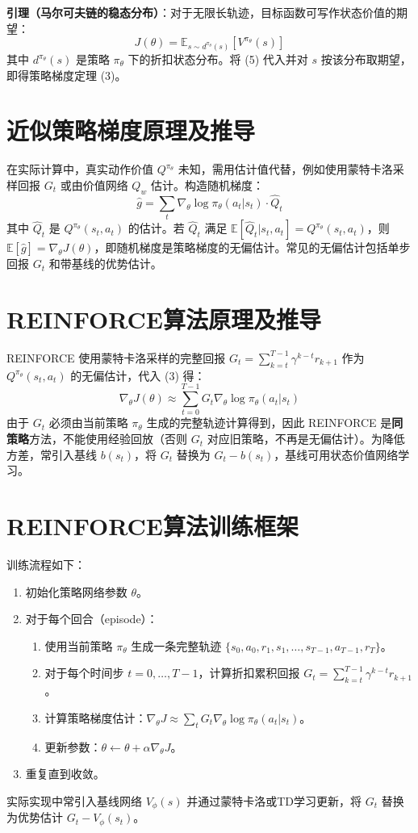 \documentclass{article}
\begin{document}
\textbf{引理（马尔可夫链的稳态分布）}：对于无限长轨迹，目标函数可写作状态价值的期望：
\[
J(\theta) = \mathbb{E}_{s \sim d^{\pi_\theta}(s)} \left[ V^{\pi_\theta}(s) \right] \tag{6}
\]
其中 \(d^{\pi_\theta}(s)\) 是策略 \(\pi_\theta\) 下的折扣状态分布。将 (5) 代入并对 \(s\) 按该分布取期望，即得策略梯度定理 (3)。

\section{近似策略梯度原理及推导}
在实际计算中，真实动作价值 \(Q^{\pi_\theta}\) 未知，需用估计值代替，例如使用蒙特卡洛采样回报 \(G_t\) 或由价值网络 \(Q_w\) 估计。构造随机梯度：
\[
\hat{g} = \sum_t \nabla_\theta \log \pi_\theta(a_t|s_t) \cdot \hat{Q}_t \tag{7}
\]
其中 \(\hat{Q}_t\) 是 \(Q^{\pi_\theta}(s_t,a_t)\) 的估计。若 \(\hat{Q}_t\) 满足 \(\mathbb{E}[\hat{Q}_t | s_t,a_t] = Q^{\pi_\theta}(s_t,a_t)\)，则 \(\mathbb{E}[\hat{g}] = \nabla_\theta J(\theta)\)，即随机梯度是策略梯度的无偏估计。常见的无偏估计包括单步回报 \(G_t\) 和带基线的优势估计。

\section{REINFORCE算法原理及推导}
REINFORCE 使用蒙特卡洛采样的完整回报 \(G_t = \sum_{k=t}^{T-1} \gamma^{k-t} r_{k+1}\) 作为 \(Q^{\pi_\theta}(s_t,a_t)\) 的无偏估计，代入 (3) 得：
\[
\nabla_\theta J(\theta) \approx \sum_{t=0}^{T-1} G_t \nabla_\theta \log \pi_\theta(a_t|s_t) \tag{8}
\]
由于 \(G_t\) 必须由当前策略 \(\pi_\theta\) 生成的完整轨迹计算得到，因此 REINFORCE 是\textbf{同策略}方法，不能使用经验回放（否则 \(G_t\) 对应旧策略，不再是无偏估计）。为降低方差，常引入基线 \(b(s_t)\)，将 \(G_t\) 替换为 \(G_t - b(s_t)\)，基线可用状态价值网络学习。

\section{REINFORCE算法训练框架}
训练流程如下：
\begin{enumerate}
    \item 初始化策略网络参数 \(\theta\)。
    \item 对于每个回合（episode）：
    \begin{enumerate}
        \item 使用当前策略 \(\pi_\theta\) 生成一条完整轨迹 \(\{s_0,a_0,r_1,s_1,\dots,s_{T-1},a_{T-1},r_T\}\)。
        \item 对于每个时间步 \(t = 0,\dots,T-1\)，计算折扣累积回报 \(G_t = \sum_{k=t}^{T-1} \gamma^{k-t} r_{k+1}\)。
        \item 计算策略梯度估计：\(\nabla_\theta J \approx \sum_t G_t \nabla_\theta \log \pi_\theta(a_t|s_t)\)。
        \item 更新参数：\(\theta \leftarrow \theta + \alpha \nabla_\theta J\)。
    \end{enumerate}
    \item 重复直到收敛。
\end{enumerate}
实际实现中常引入基线网络 \(V_\phi(s)\) 并通过蒙特卡洛或TD学习更新，将 \(G_t\) 替换为优势估计 \(G_t - V_\phi(s_t)\)。
\end{document}
